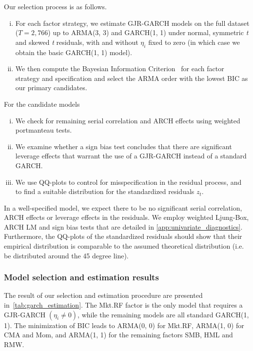 Our selection process is as follows.

\begin{enumerate}[(i)]
  \item For each factor strategy, we estimate GJR-GARCH models on the full dataset ($T = 2,766$) up to ARMA(3, 3) and GARCH(1, 1) under normal, symmetric \emph{t} and skewed \emph{t} residuals, with and without $\eta_i$ fixed to zero (in which case we obtain the basic GARCH(1, 1) model).
  \item We then compute the Bayesian Information Criterion~\autocite[BIC]{Schwarz1978} for each factor strategy and specification and select the ARMA order with the lowest BIC as our primary candidates.
\end{enumerate}

\noindent For the candidate models

\begin{enumerate}[(i)]
  \item We check for remaining serial correlation and ARCH effects using weighted portmanteau tests.
  \item We examine whether a sign bias test concludes that there are significant leverage effects that warrant the use of a GJR-GARCH instead of a standard GARCH.
  \item We use QQ-plots to control for misspecification in the residual process, and to find a suitable distribution for the standardized residuals $z_t$.
\end{enumerate}

In a well-specified model, we expect there to be no significant serial correlation, ARCH effects or leverage effects in the residuals. We employ weighted Ljung-Box, ARCH LM and sign bias tests that are detailed in \autoref{app:univariate_diagnostics}. Furthermore, the QQ-plots of the standardized residuals should show that their empirical distribution is comparable to the assumed theoretical distribution (i.e. be distributed around the 45 degree line).

\subsubsection{Model selection and estimation results}

The result of our selection and estimation procedure are presented in~\autoref{tab:garch_estimation}. The Mkt.RF factor is the only model that requires a GJR-GARCH $(\eta_i \neq 0)$, while the remaining models are all standard GARCH(1, 1). The minimization of BIC leads to ARMA(0, 0) for Mkt.RF, ARMA(1, 0) for CMA and Mom, and ARMA(1, 1) for the remaining factors SMB, HML and RMW. 

